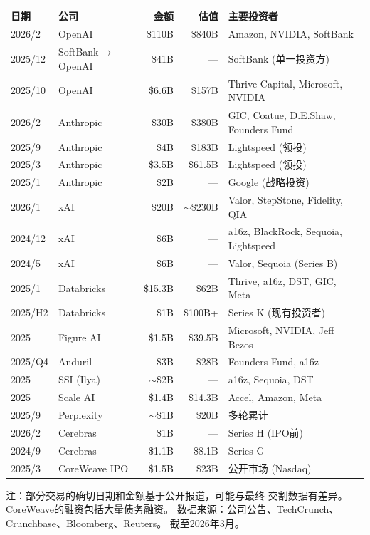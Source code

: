 \begin{keybox}
\small
\begin{tabularx}{\textwidth}{l l r r X}
\toprule
\rowcolor{figLightGray}
\textbf{日期} & \textbf{公司} & \textbf{金额}
  & \textbf{估值} & \textbf{主要投资者} \\
\midrule
2026/2  & OpenAI         & \$110B  & \$840B
  & Amazon, NVIDIA, SoftBank \\
2025/12 & SoftBank$\to$OpenAI & \$41B & ---
  & SoftBank (单一投资方) \\
2025/10 & OpenAI         & \$6.6B  & \$157B
  & Thrive Capital, Microsoft, NVIDIA \\
\midrule
2026/2  & Anthropic      & \$30B   & \$380B
  & GIC, Coatue, D.E.Shaw, Founders Fund \\
2025/9  & Anthropic      & \$4B    & \$183B
  & Lightspeed (领投) \\
2025/3  & Anthropic      & \$3.5B  & \$61.5B
  & Lightspeed (领投) \\
2025/1  & Anthropic      & \$2B    & ---
  & Google (战略投资) \\
\midrule
2026/1  & xAI            & \$20B   & $\sim$\$230B
  & Valor, StepStone, Fidelity, QIA \\
2024/12 & xAI            & \$6B    & ---
  & a16z, BlackRock, Sequoia, Lightspeed \\
2024/5  & xAI            & \$6B    & ---
  & Valor, Sequoia (Series B) \\
\midrule
2025/1  & Databricks     & \$15.3B & \$62B
  & Thrive, a16z, DST, GIC, Meta \\
2025/H2 & Databricks     & \$1B    & \$100B+
  & Series K (现有投资者) \\
\midrule
2025    & Figure AI      & \$1.5B  & \$39.5B
  & Microsoft, NVIDIA, Jeff Bezos \\
2025/Q4 & Anduril        & \$3B    & \$28B
  & Founders Fund, a16z \\
2025    & SSI (Ilya)     & $\sim$\$2B & ---
  & a16z, Sequoia, DST \\
\midrule
2025    & Scale AI       & \$1.4B  & \$14.3B
  & Accel, Amazon, Meta \\
2025/9  & Perplexity     & $\sim$\$1B & \$20B
  & 多轮累计 \\
2026/2  & Cerebras       & \$1B    & ---
  & Series H (IPO前) \\
2024/9  & Cerebras       & \$1.1B  & \$8.1B
  & Series G \\
2025/3  & CoreWeave IPO  & \$1.5B  & \$23B
  & 公开市场 (Nasdaq) \\
\bottomrule
\end{tabularx}

\medskip
\noindent 注：部分交易的确切日期和金额基于公开报道，可能与最终
交割数据有差异。CoreWeave的融资包括大量债务融资。
数据来源：公司公告、TechCrunch、Crunchbase、Bloomberg、Reuters。
截至2026年3月。
\end{keybox}

